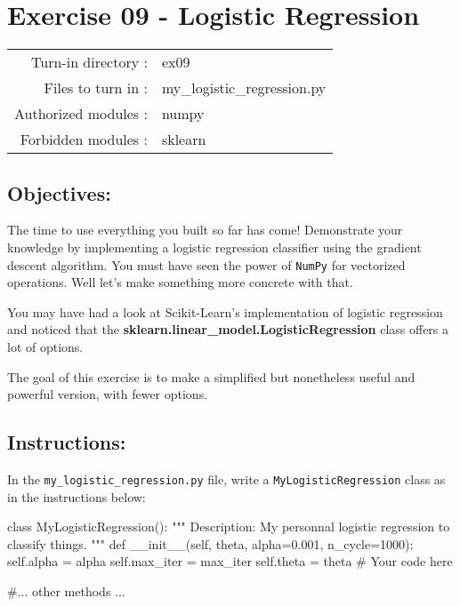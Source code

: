 \documentclass[]{article}
\newenvironment{Shaded}{\begin{snugshade}}{\end{snugshade}}
\newcommand{\CommentTok}[1]{\textcolor[rgb]{0.48,0.49,0.49}{#1}}
\newcommand{\DecValTok}[1]{\textcolor[rgb]{0.96,0.45,0.00}{#1}}
\newcommand{\FloatTok}[1]{\textcolor[rgb]{0.96,0.45,0.00}{#1}}
\newcommand{\FunctionTok}[1]{\textcolor[rgb]{0.56,0.27,0.68}{#1}}
\newcommand{\KeywordTok}[1]{\textcolor[rgb]{0.81,0.81,0.76}{#1}}
\newcommand{\NormalTok}[1]{\textcolor[rgb]{0.81,0.81,0.76}{#1}}
\newcommand{\OperatorTok}[1]{\textcolor[rgb]{0.81,0.81,0.76}{#1}}
\newcommand{\VariableTok}[1]{\textcolor[rgb]{0.15,0.68,0.68}{#1}}
\begin{document}
\clearpage

\hypertarget{exercise-09---logistic-regression-1}{%
\section{Exercise 09 - Logistic
Regression}\label{exercise-09---logistic-regression-1}}

\begin{longtable}[]{@{}rl@{}}
\toprule
\endhead
Turn-in directory : & ex09\tabularnewline
Files to turn in : & my\_logistic\_regression.py\tabularnewline
Authorized modules : & numpy\tabularnewline
Forbidden modules : & sklearn\tabularnewline
\bottomrule
\end{longtable}

\hypertarget{objectives-8}{%
\subsection{Objectives:}\label{objectives-8}}

The time to use everything you built so far has come! Demonstrate your
knowledge by implementing a logistic regression classifier using the
gradient descent algorithm. You must have seen the power of
\texttt{NumPy} for vectorized operations. Well let's make something more
concrete with that.

You may have had a look at Scikit-Learn's implementation of logistic
regression and noticed that the
\textbf{sklearn.linear\_model.LogisticRegression} class offers a lot of
options.

The goal of this exercise is to make a simplified but nonetheless useful
and powerful version, with fewer options.

\hypertarget{instructions-8}{%
\subsection{Instructions:}\label{instructions-8}}

In the \texttt{my\_logistic\_regression.py} file, write a
\texttt{MyLogisticRegression} class as in the instructions below:

\begin{Shaded}
\begin{Highlighting}[]
\KeywordTok{class}\NormalTok{ MyLogisticRegression():}
    \CommentTok{"""}
\CommentTok{    Description:}
\CommentTok{        My personnal logistic regression to classify things.}
\CommentTok{    """}
    \KeywordTok{def} \FunctionTok{__init__}\NormalTok{(}\VariableTok{self}\NormalTok{, theta, alpha}\OperatorTok{=}\FloatTok{0.001}\NormalTok{, n_cycle}\OperatorTok{=}\DecValTok{1000}\NormalTok{):}
        \VariableTok{self}\NormalTok{.alpha }\OperatorTok{=}\NormalTok{ alpha}
        \VariableTok{self}\NormalTok{.max_iter }\OperatorTok{=}\NormalTok{ max_iter}
        \VariableTok{self}\NormalTok{.theta }\OperatorTok{=}\NormalTok{ theta}
        \CommentTok{# Your code here}

    \CommentTok{#... other methods ...}
\end{Highlighting}
\end{Shaded}
\end{document}
